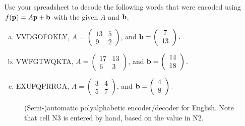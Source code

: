 \begin{exercise}{}
Use your spreadsheet to decode the following words that were encoded using $f({\bold p}) = A {\bold p} + {\bold b}$ with the given $A$ and ${\bold b}$.
\begin{enumerate}[(a)]
\item
VVDGOFOKLY, $A= \left(
\begin{array}{cc}
13 & 5 \\
9 & 2
\end{array}
\right)$, and ${\bold b} = \left( \begin{array}{c} 7 \\ 13 \end{array}\right).$ 
\item
VWFGTWQKTA, $A= \left(
\begin{array}{cc}
17 & 13 \\
6 & 3
\end{array}
\right)$, and ${\bold b} = \left( \begin{array}{c} 14 \\ 18 \end{array}\right).$ 
\item
EXUFQPRRGA, $A= \left(
\begin{array}{cc}
3 & 4 \\
5 & 7
\end{array}
\right)$, and ${\bold b} = \left( \begin{array}{c} 4 \\ 8 \end{array}\right).$ 
\end{enumerate}
\begin{figure}[h]
\caption{(Semi-)automatic polyalphabetic encoder/decoder for English. Note that cell N3 is entered by hand, based on the value in N2.}
\label{fig:polycrypto}
\end{figure}
\end{exercise}


